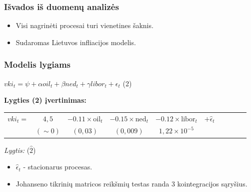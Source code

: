 \documentclass[utf8x,hyperref={unicode}]{beamer}
\begin{document}
\begin{frame}

\frametitle{Išvados iš duomenų analizės}
\begin{itemize}
\item\large{Visi nagrinėti procesai turi vienetines šaknis.}
\item\large{Sudaromas Lietuvos infliacijos modelis.}
\end{itemize}
\end{frame}

\begin{frame}
\frametitle{Modelis lygiams}
\begin{center}
$\textit{vki}_t = \psi + \alpha\textit{oil}_t + \beta\textit{ned}_t + \gamma\textit{libor}_t + \epsilon_t$ (2)
\end{center}

\textbf{Lygties (2) įvertinimas:}

\begin{center}
\begin{tabular}{cccccccccc} 
$\textit{vki}_t =$&$4,5$&$-0.11\times\text{oil}_t$&$-0.15\times\text{ned}_t$&$-0.12\times\text{libor}_t$&$+\hat{\epsilon}_t$\\ 
  &$(\sim 0)$&$(0,03)$&$(0,009)$&$1,22 \times 10^{-5}$\\ 
\end{tabular} 

\textit{Lygtis:} ($\hat{2}$)
\end{center}



\begin{itemize}
\item $\hat{\epsilon}_t$ - stacionarus procesas.
\item Johanseno tikrinių matricos reikšmių testas randa 3 kointegracijos sąryšius.
\end{itemize}

\end{frame}
\end{document}

